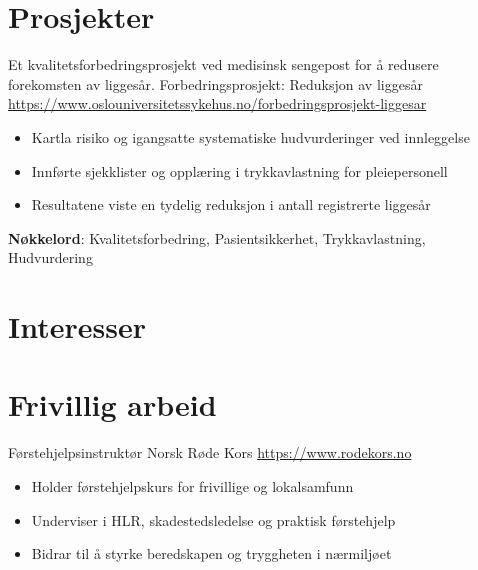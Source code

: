 \documentclass[a4paper, serif, 10pt]{moderncv}
\begin{document}
\section{Prosjekter}

        {Et kvalitetsforbedringsprosjekt ved medisinsk sengepost for å redusere forekomsten av liggesår.}
        {Forbedringsprosjekt: Reduksjon av liggesår}
        {\url{https://www.oslouniversitetssykehus.no/forbedringsprosjekt-liggesar}}
        {}
        {\begin{itemize}
\item Kartla risiko og igangsatte systematiske hudvurderinger ved innleggelse
\item Innførte sjekklister og opplæring i trykkavlastning for pleiepersonell
\item Resultatene viste en tydelig reduksjon i antall registrerte liggesår
\end{itemize}
\textbf{Nøkkelord}: Kvalitetsforbedring, Pasientsikkerhet, Trykkavlastning, Hudvurdering}
\section{Interesser}

\section{Frivillig arbeid}

        {Førstehjelpsinstruktør}
        {Norsk Røde Kors}
        {\url{https://www.rodekors.no}}
        {}
        {\begin{itemize}
\item Holder førstehjelpskurs for frivillige og lokalsamfunn
\item Underviser i HLR, skadestedsledelse og praktisk førstehjelp
\item Bidrar til å styrke beredskapen og tryggheten i nærmiljøet
\end{itemize}}
    
\end{document}
